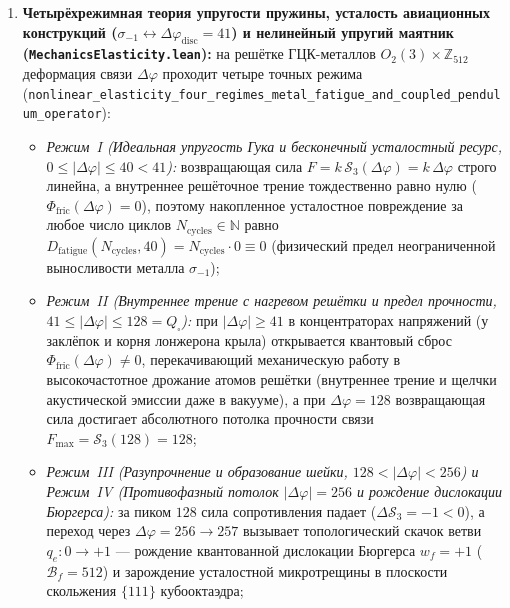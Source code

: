 \begin{enumerate}[label=\textbf{\arabic*.},leftmargin=*]
\begin{itemize}[noitemsep]
  \end{itemize}
\item \textbf{Четырёхрежимная теория упругости пружины, усталость авиационных конструкций ($\sigma_{-1}\leftrightarrow \Delta\varphi_{\mathrm{disc}}=41$) и нелинейный упругий маятник (\texttt{MechanicsElasticity.lean}):}
  на решётке ГЦК-металлов $O_2(3)\times\mathbb{Z}_{512}$ деформация связи $\Delta\varphi$ проходит четыре точных режима (\texttt{nonlinear\_elasticity\_four\_regimes\_metal\_fatigue\_and\_coupled\_pendulum\_operator}):
  \begin{itemize}[noitemsep]
  \item \emph{Режим~I (Идеальная упругость Гука и бесконечный усталостный ресурс, $0 \le |\Delta\varphi| \le 40 < 41$):} возвращающая сила $F = k\,\mathcal{S}_3(\Delta\varphi) = k\,\Delta\varphi$ строго линейна, а внутреннее решёточное трение тождественно равно нулю ($\Phi_{\mathrm{fric}}(\Delta\varphi) = 0$), поэтому накопленное усталостное повреждение за любое число циклов $N_{\mathrm{cycles}}\in\mathbb{N}$ равно $D_{\mathrm{fatigue}}(N_{\mathrm{cycles}}, 40) = N_{\mathrm{cycles}}\cdot 0 \equiv 0$ (физический предел неограниченной выносливости металла $\sigma_{-1}$);
  \item \emph{Режим~II (Внутреннее трение с нагревом решётки и предел прочности, $41 \le |\Delta\varphi| \le 128 = Q_\square$):} при $|\Delta\varphi| \ge 41$ в концентраторах напряжений (у заклёпок и корня лонжерона крыла) открывается квантовый сброс $\Phi_{\mathrm{fric}}(\Delta\varphi) \ne 0$, перекачивающий механическую работу в высокочастотное дрожание атомов решётки (внутреннее трение и щелчки акустической эмиссии даже в вакууме), а при $\Delta\varphi = 128$ возвращающая сила достигает абсолютного потолка прочности связи $F_{\max} = \mathcal{S}_3(128) = 128$;
  \item \emph{Режим~III (Разупрочнение и образование шейки, $128 < |\Delta\varphi| < 256$) и Режим~IV (Противофазный потолок $|\Delta\varphi| = 256$ и рождение дислокации Бюргерса):} за пиком $128$ сила сопротивления падает ($\Delta\mathcal{S}_3 = -1 < 0$), а переход через $\Delta\varphi = 256 \to 257$ вызывает топологический скачок ветви $q_e : 0 \to +1$ --- рождение квантованной дислокации Бюргерса $w_f = +1$ ($\mathcal{B}_f = 512$) и зарождение усталостной микротрещины в плоскости скольжения $\{111\}$ кубооктаэдра;

\end{itemize}
\end{enumerate}
